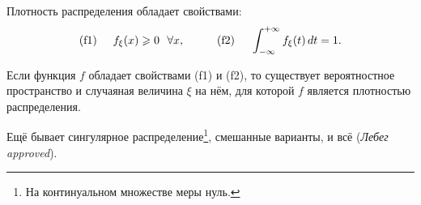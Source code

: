 \begin{to_thr}[]
    Плотность распределения обладает свойствами:
    \begin{equation*}
        \textnormal{(f1)} \hspace{5 mm} f_\xi (x) \geq 0 \ \ \forall x, 
        \hspace{10 mm}
        \textnormal{(f2)} \hspace{5 mm} \int_{-\infty}^{+\infty} f_\xi (t) \d t = 1
        .
    \end{equation*}
\end{to_thr}

\begin{to_thr}
    Если функция $f$ обладает свойствами \textnormal{(f1)} и \textnormal{(f2)}, то существует вероятностное пространство и случаяная величина $\xi$ на нём, для которой $f$ является плотностью распределения.
\end{to_thr}

Ещё бывает сингулярное распределение\footnote{
    На континуальном множестве меры нуль.
}, смешанные варианты, и всё (\textit{Лебег} \textit{approved}).